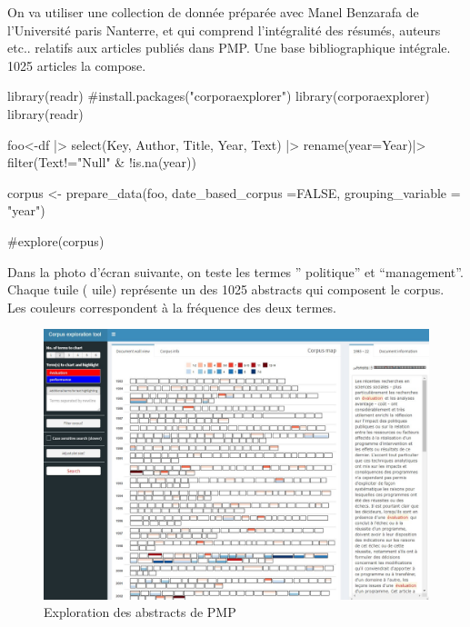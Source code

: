 \documentclass[
  letterpaper,
  DIV=11,
  numbers=noendperiod]{scrreprt}
\newenvironment{Shaded}{\begin{snugshade}}{\end{snugshade}}
\newcommand{\AttributeTok}[1]{\textcolor[rgb]{0.40,0.45,0.13}{#1}}
\newcommand{\CommentTok}[1]{\textcolor[rgb]{0.37,0.37,0.37}{#1}}
\newcommand{\ConstantTok}[1]{\textcolor[rgb]{0.56,0.35,0.01}{#1}}
\newcommand{\FunctionTok}[1]{\textcolor[rgb]{0.28,0.35,0.67}{#1}}
\newcommand{\NormalTok}[1]{\textcolor[rgb]{0.00,0.23,0.31}{#1}}
\newcommand{\OtherTok}[1]{\textcolor[rgb]{0.00,0.23,0.31}{#1}}
\newcommand{\SpecialCharTok}[1]{\textcolor[rgb]{0.37,0.37,0.37}{#1}}
\newcommand{\StringTok}[1]{\textcolor[rgb]{0.13,0.47,0.30}{#1}}
\begin{document}
On va utiliser une collection de donnée préparée avec Manel Benzarafa de
l'Université paris Nanterre, et qui comprend l'intégralité des résumés,
auteurs etc.. relatifs aux articles publiés dans PMP. Une base
bibliographique intégrale. 1025 articles la compose.

\begin{Shaded}
\begin{Highlighting}[]
\FunctionTok{library}\NormalTok{(readr) }
\CommentTok{\#install.packages("corporaexplorer") }
\FunctionTok{library}\NormalTok{(corporaexplorer)   }
\FunctionTok{library}\NormalTok{(readr) }

\NormalTok{foo}\OtherTok{\textless{}{-}}\NormalTok{df }\SpecialCharTok{|\textgreater{}} 
  \FunctionTok{select}\NormalTok{(Key, Author, Title, Year, Text) }\SpecialCharTok{|\textgreater{}}
  \FunctionTok{rename}\NormalTok{(}\AttributeTok{year=}\NormalTok{Year)}\SpecialCharTok{|\textgreater{}}
  \FunctionTok{filter}\NormalTok{(Text}\SpecialCharTok{!=}\StringTok{"Null"} \SpecialCharTok{\&} \SpecialCharTok{!}\FunctionTok{is.na}\NormalTok{(year))    }

\NormalTok{corpus }\OtherTok{\textless{}{-}} \FunctionTok{prepare\_data}\NormalTok{(foo, }\AttributeTok{date\_based\_corpus =}\ConstantTok{FALSE}\NormalTok{, }\AttributeTok{grouping\_variable =} \StringTok{"year"}\NormalTok{)}

\CommentTok{\#explore(corpus)}
\end{Highlighting}
\end{Shaded}

Dans la photo d'écran suivante, on teste les termes '' politique'' et
``management''. Chaque tuile ( uile) représente un des 1025 abstracts
qui composent le corpus. Les couleurs correspondent à la fréquence des
deux termes.

\begin{figure}[H]

{\centering \includegraphics{./image/corpexplor.jpg}

}

\caption{Exploration des abstracts de PMP}

\end{figure}%
\end{document}
